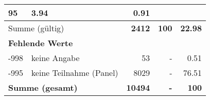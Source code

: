 \begin{longtable}{lXrrr}
       \num{95} &
       \num[round-mode=places,round-precision=2]{3.94} &
         \num[round-mode=places,round-precision=2]{0.91} \\
     \midrule
     \multicolumn{2}{l}{Summe (gültig)} &
       \textbf{\num{2412}} &
     \textbf{\num{100}} &
       \textbf{\num[round-mode=places,round-precision=2]{22.98}} \\
     \multicolumn{5}{l}{\textbf{Fehlende Werte}}\\
       -998 &
       keine Angabe &
         \num{53} &
        - &
         \num[round-mode=places,round-precision=2]{0.51} \\
       -995 &
       keine Teilnahme (Panel) &
         \num{8029} &
        - &
         \num[round-mode=places,round-precision=2]{76.51} \\
     \midrule
     \multicolumn{2}{l}{\textbf{Summe (gesamt)}} &
          \textbf{\num{10494}} &
        \textbf{-} &
        \textbf{\num{100}} \\
     \bottomrule
     \end{longtable}
     
